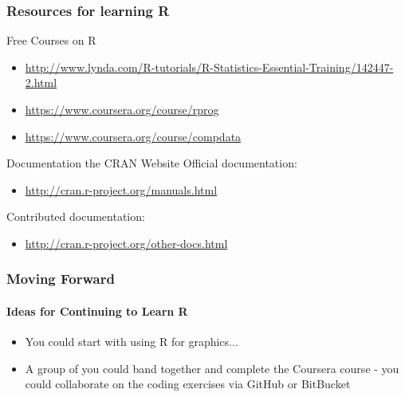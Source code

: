 \documentclass[xcolor=dvipsnames]{beamer}
\begin{document}
\begin{frame}
\frametitle{Resources for learning R}

\begin{block}{Free Courses on R}
\begin{itemize}
\item \url{http://www.lynda.com/R-tutorials/R-Statistics-Essential-Training/142447-2.html}
\newline
\item \url{https://www.coursera.org/course/rprog}
\newline
\item \url{https://www.coursera.org/course/compdata}
\end{itemize}
\end{block}

\begin{block}{Documentation the CRAN Website}
Official documentation: \begin{itemize}
\item \url{http://cran.r-project.org/manuals.html}
\newline
\end{itemize}

Contributed documentation: \begin{itemize}
\item \url{http://cran.r-project.org/other-docs.html}
\newline
\end{itemize}
\end{block}

\end{frame}

\begin{frame}
\frametitle{Moving Forward}
\framesubtitle{Ideas for Continuing to Learn R}

\begin{itemize}
\item You could start with using R for graphics...
\newline
\item A group of you could band together and complete the Coursera course - you could collaborate on the coding exercises via GitHub or BitBucket
\end{itemize}

\end{frame}
\end{document}
